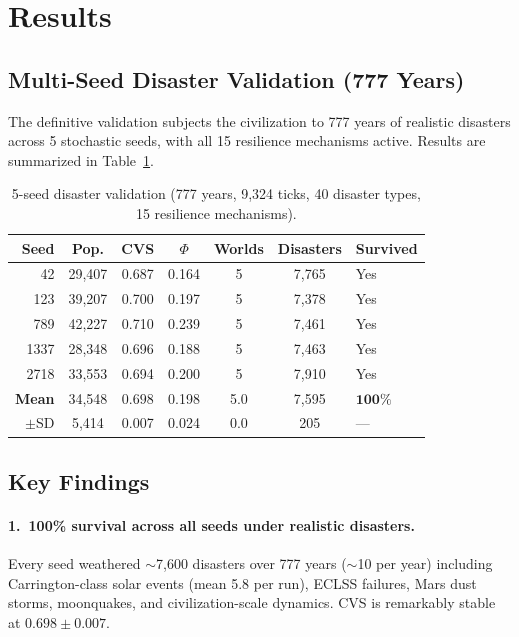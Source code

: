 \documentclass[12pt,a4paper]{article}
\begin{document}

\section{Results}
\label{sec:results}

\subsection{Multi-Seed Disaster Validation (777 Years)}

The definitive validation subjects the civilization to 777 years of realistic disasters across 5 stochastic seeds, with all 15 resilience mechanisms active. Results are summarized in Table~\ref{tab:results}.

\begin{table}[h]
\centering
\caption{5-seed disaster validation (777 years, 9,324 ticks, 40 disaster types, 15 resilience mechanisms).}
\label{tab:results}
\begin{tabular}{@{}rcccccl@{}}
\toprule
\textbf{Seed} & \textbf{Pop.} & \textbf{CVS} & \textbf{$\Phi$} & \textbf{Worlds} & \textbf{Disasters} & \textbf{Survived} \\
\midrule
42    & 29,407 & 0.687 & 0.164 & 5 & 7,765 & Yes \\
123   & 39,207 & 0.700 & 0.197 & 5 & 7,378 & Yes \\
789   & 42,227 & 0.710 & 0.239 & 5 & 7,461 & Yes \\
1337  & 28,348 & 0.696 & 0.188 & 5 & 7,463 & Yes \\
2718  & 33,553 & 0.694 & 0.200 & 5 & 7,910 & Yes \\
\midrule
\textbf{Mean} & 34,548 & $\mathbf{0.698}$ & 0.198 & 5.0 & 7,595 & $\mathbf{100\%}$ \\
$\pm$SD       & 5,414  & 0.007 & 0.024 & 0.0 & 205 & --- \\
\bottomrule
\end{tabular}
\end{table}

\subsection{Key Findings}

\paragraph{1.\ 100\% survival across all seeds under realistic disasters.} Every seed weathered $\sim$7,600 disasters over 777 years ($\sim$10 per year) including Carrington-class solar events (mean 5.8 per run), ECLSS failures, Mars dust storms, moonquakes, and civilization-scale dynamics. CVS is remarkably stable at $0.698 \pm 0.007$.
\end{document}
